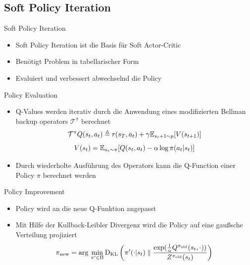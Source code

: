 \subsection{Soft Policy Iteration}
\begin{frame}{Soft Policy Iteration}
	\begin{itemize}
		\item Soft Policy Iteration ist die Basis für Soft Actor-Critic
		\item Benötigt Problem in tabellarischer Form
		\item Evaluiert und verbessert abwechselnd die Policy
	\end{itemize} 
\end{frame}

\begin{frame}{Policy Evaluation}
	\begin{itemize}
		\item Q-Values werden iterativ durch die Anwendung eines modifizierten Bellman backup operators $\mathcal{T}^\pi$ berechnet
		\begin{equation}
			\mathcal{T}^\pi \mathnormal{Q}(s_t,a_t) \triangleq \mathnormal{r}(s_T, a_t) + \gamma \mathbb{E}_{s_t+1\sim \mathnormal{p}}[\mathnormal{V}(s_{t+1})] \notag
		\end{equation}
		\begin{equation}
			\mathnormal{V}(s_{t}) = \mathbb{E}_{a_t \sim \pi}[\mathnormal{Q}(s_t, a_t) - \alpha \, \mathrm{log} \, \pi (a_t|s_t)] \notag
		\end{equation}
		\item Durch wiederholte Ausführung des Operators kann die Q-Function einer Policy $\pi$ berechnet werden
	\end{itemize}
\end{frame}

\begin{frame}{Policy Improvement}
	\begin{itemize}
		\item Policy wird an die neue Q-Funktion angepasst
		\item Mit Hilfe der Kullback-Leibler Divergenz wird die Policy auf eine gaußsche Verteilung projiziert
		\begin{equation}
			\pi_{\mathrm{new}} = \mathrm{arg} \, \min_{\pi^\prime \in \Pi} \mathrm{D_{KL}} \left( \pi^\prime(\cdot | s_t) \parallel \frac{\mathrm{exp} (\frac{1}{\alpha}\mathnormal{Q}^{\pi_{\mathrm{old}}}(s_t, \cdot))}{\mathnormal{Z}^{\pi_{\mathrm{old}}}(s_t)} \right) \notag
		\end{equation}
	\end{itemize} 
\end{frame}
